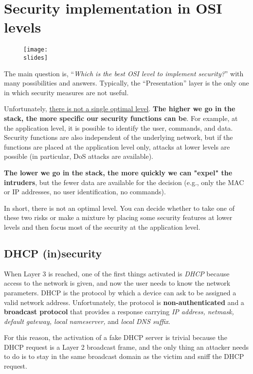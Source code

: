 \section{Security implementation in OSI levels}

\begin{figure}[h]
    \centering
    \texttt{[image: \\slides]}
\end{figure}

The main question is, “\textit{Which is the best OSI level to implement security?}” with many possibilities and answers. Typically, the “Presentation” layer is the only one in which security measures are not useful.

Unfortunately, \underline{there is not a single optimal level}. \textbf{The higher we go in the stack, the more specific our security functions can be}. For example, at the application level, it is possible to identify the user, commands, and data. Security functions are also independent of the underlying network, but if the functions are placed at the application level only, attacks at lower levels are possible (in particular, DoS attacks are available).

\textbf{The lower we go in the stack, the more quickly we can "expel" the intruders}, but the fewer data are available for the decision (e.g., only the MAC or IP addresses, no user identification, no commands).

In short, there is not an optimal level. You can decide whether to take one of these two risks or make a mixture by placing some security features at lower levels and then focus most of the security at the application level.


\subsection{DHCP (in)security}

When Layer 3 is reached, one of the first things activated is \textit{DHCP} because access to the network is given, and now the user needs to know the network parameters. DHCP is the protocol by which a device can ask to be assigned a valid network address. Unfortunately, the protocol is \textbf{non-authenticated} and a \textbf{broadcast protocol} that provides a response carrying \textit{IP address, netmask, default gateway, local nameserver,} and \textit{local DNS suffix}.

For this reason, the activation of a fake DHCP server is trivial because the DHCP request is a Layer 2 broadcast frame, and the only thing an attacker needs to do is to stay in the same broadcast domain as the victim and sniff the DHCP request.


